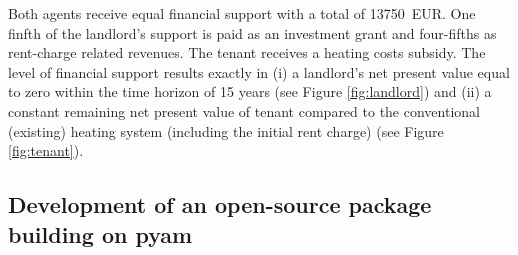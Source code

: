 Both agents receive equal financial support with a total of \SI{13750}{EUR}. One finfth of the landlord's support is paid as an investment grant and four-fifths as rent-charge related revenues. The tenant receives a heating costs subsidy. The level of financial support results exactly in (i) a landlord's net present value equal to zero within the time horizon of 15 years (see Figure \ref{fig:landlord}) and (ii) a constant remaining net present value of tenant compared to the conventional (existing) heating system (including the initial rent charge) (see Figure \ref{fig:tenant}). 

\subsection{Development of an open-source package building on pyam}\label{open}










